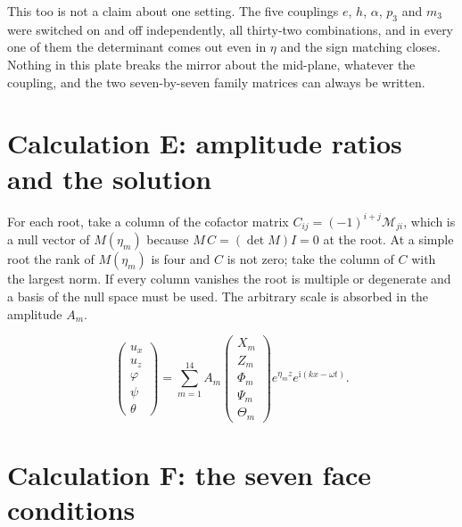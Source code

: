 \documentclass[11pt]{article}
\makeatletter
\newif\ifshowworked
\newenvironment{worked}{%
  \ifshowworked\par\smallskip\noindent\textit{Working.}\par\smallskip\else
  \setbox\z@\vbox\bgroup\fi}{\ifshowworked\par\smallskip\else\egroup\fi}
\newcommand{\ii}{\mathrm{i}}
\makeatother
\begin{document}
This too is not a claim about one setting. The five couplings $e$, $h$, $\alpha$, $p_3$ and $m_3$ were
switched on and off independently, all thirty-two combinations, and in every one of them the determinant
comes out even in $\eta$ and the sign matching closes. Nothing in this plate breaks the mirror about the
mid-plane, whatever the coupling, and the two seven-by-seven family matrices can always be written.

\section{Calculation E: amplitude ratios and the solution}\label{sec:calcE}

\begin{worked}
For each root, take a column of the cofactor matrix $C_{ij}=(-1)^{i+j}\mathcal M_{ji}$, which is a null
vector of $M(\eta_m)$ because $M\,C=(\det M)I=0$ at the root. At a simple root the rank of $M(\eta_m)$ is four and $C$ is not zero; take the column of $C$ with the largest
norm. If every column vanishes the root is multiple or degenerate and a basis of the null space must be used.
The arbitrary scale is absorbed in the amplitude $A_m$.
\end{worked}

\begin{equation}
\begin{pmatrix}u_x\\u_z\\\varphi\\\psi\\\theta\end{pmatrix}
=\sum_{m=1}^{14}A_m
\begin{pmatrix}X_m\\Z_m\\\Phi_m\\\Psi_m\\\Theta_m\end{pmatrix}
e^{\eta_mz}e^{\ii(kx-\omega t)} .
\end{equation}

\section{Calculation F: the seven face conditions}\label{sec:calcF}
\end{document}
